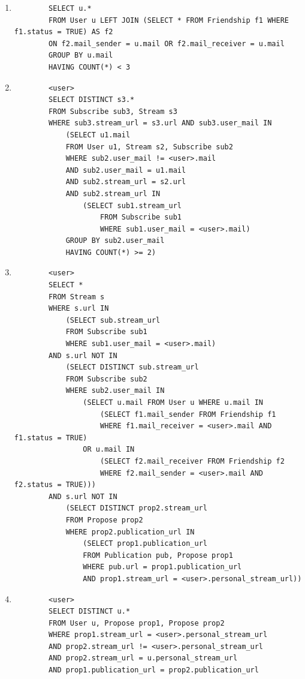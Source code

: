 \documentclass[a4paper,10pt]{article}
\begin{document}
	\begin{enumerate}
	    \item 
	    \begin{verbatim}
		SELECT u.*
		FROM User u LEFT JOIN (SELECT * FROM Friendship f1 WHERE f1.status = TRUE) AS f2 
		ON f2.mail_sender = u.mail OR f2.mail_receiver = u.mail
		GROUP BY u.mail
		HAVING COUNT(*) < 3
             \end{verbatim}
	    \item
             \begin{verbatim}
		<user>
		SELECT DISTINCT s3.*
		FROM Subscribe sub3, Stream s3
		WHERE sub3.stream_url = s3.url AND sub3.user_mail IN
		    (SELECT u1.mail
		    FROM User u1, Stream s2, Subscribe sub2
		    WHERE sub2.user_mail != <user>.mail
		    AND sub2.user_mail = u1.mail 
		    AND sub2.stream_url = s2.url 
		    AND sub2.stream_url IN    
		        (SELECT sub1.stream_url 
		            FROM Subscribe sub1 
		            WHERE sub1.user_mail = <user>.mail)
		    GROUP BY sub2.user_mail
		    HAVING COUNT(*) >= 2)
             \end{verbatim}
	    \item
	    \begin{verbatim}
		<user>
		SELECT *
		FROM Stream s
		WHERE s.url IN
		    (SELECT sub.stream_url
		    FROM Subscribe sub1
		    WHERE sub1.user_mail = <user>.mail)
		AND s.url NOT IN
		    (SELECT DISTINCT sub.stream_url
		    FROM Subscribe sub2
		    WHERE sub2.user_mail IN
		        (SELECT u.mail FROM User u WHERE u.mail IN
		            (SELECT f1.mail_sender FROM Friendship f1 
		            WHERE f1.mail_receiver = <user>.mail AND f1.status = TRUE)
		        OR u.mail IN
		            (SELECT f2.mail_receiver FROM Friendship f2 
		            WHERE f2.mail_sender = <user>.mail AND f2.status = TRUE)))
		AND s.url NOT IN
		    (SELECT DISTINCT prop2.stream_url
		    FROM Propose prop2
		    WHERE prop2.publication_url IN
		        (SELECT prop1.publication_url
		        FROM Publication pub, Propose prop1
		        WHERE pub.url = prop1.publication_url 
		        AND prop1.stream_url = <user>.personal_stream_url))
             \end{verbatim}
	    \item 
	    \begin{verbatim}
		<user>
		SELECT DISTINCT u.*
		FROM User u, Propose prop1, Propose prop2
		WHERE prop1.stream_url = <user>.personal_stream_url
		AND prop2.stream_url != <user>.personal_stream_url
		AND prop2.stream_url = u.personal_stream_url
		AND prop1.publication_url = prop2.publication_url

\end{verbatim}
\end{enumerate}
\end{document}
